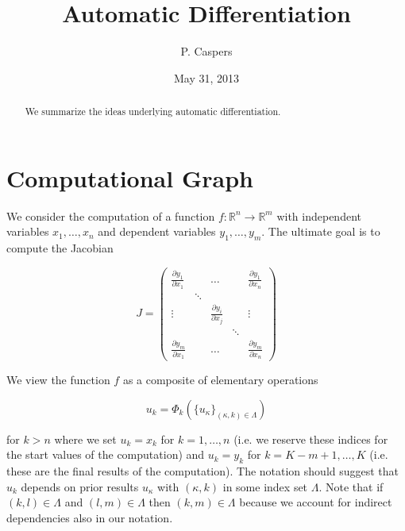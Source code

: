 \documentclass{amsart}
\theoremstyle{plain}
\numberwithin{equation}{section}
\begin{document}
\title[AD]{Automatic Differentiation}
\author{P. Caspers}
\date{May 31, 2013}
\begin{abstract}
We summarize the ideas underlying automatic differentiation.
\end{abstract}

\maketitle

\tableofcontents

\section{Computational Graph}

We consider the computation of a function $f: \mathbb{R}^n \rightarrow \mathbb{R}^m$ with independent variables $x_1, \dots , x_n$ and dependent variables $y_1, \dots , y_m$. The ultimate goal is to compute the Jacobian

\begin{equation}
J = \begin{pmatrix}
\frac{\partial y_1}{\partial x_1} &  & \dots &  & \frac{\partial y_1}{\partial x_n} \\
 & \ddots & & & \\
\vdots &  & \frac{\partial y_i}{\partial x_j} &  & \vdots \\
 &  &                                   & \ddots & \\
\frac{\partial y_m}{\partial x_1} & & \dots & & \frac{\partial y_m}{\partial x_n}
\end{pmatrix}
\end{equation}

We view the function $f$ as a composite of elementary operations

\begin{equation}
u_k = \Phi_k( \{u_\kappa\}_{(\kappa,k) \in \Lambda})
\end{equation}

for $k > n$ where we set $u_k = x_k$ for $k=1,\dots,n$ (i.e. we reserve these indices for the start values of the computation) and $u_k = y_k$ for $k=K-m+1, \dots, K$ (i.e. these are the final results of the computation). The notation should suggest that $u_k$ depends on prior results $u_\kappa$ with $(\kappa,k)$ in some index set $\Lambda$. Note that if $(k,l)\in\Lambda$ and $(l,m)\in\Lambda$ then $(k,m)\in\Lambda$ because we account for indirect dependencies also in our notation.
\end{document}
